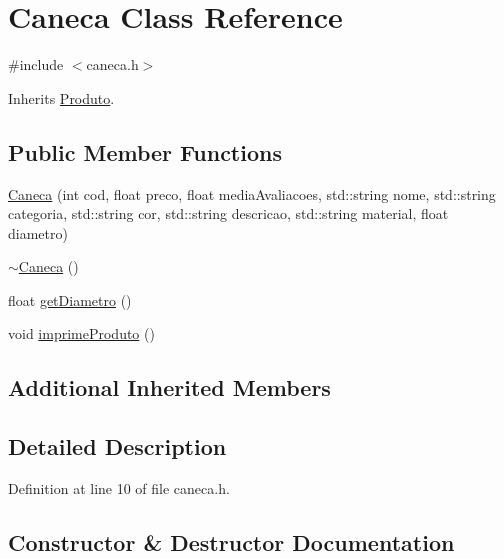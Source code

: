 \hypertarget{class_caneca}{}\section{Caneca Class Reference}
\label{class_caneca}


{\ttfamily \#include $<$caneca.\+h$>$}



Inherits \hyperlink{class_produto}{Produto}.

\subsection*{Public Member Functions}
\begin{DoxyCompactItemize}
\item 
\hyperlink{class_caneca_a192435fdd06311e0103bc516f7986934}{Caneca} (int cod, float preco, float media\+Avaliacoes, std\+::string nome, std\+::string categoria, std\+::string cor, std\+::string descricao, std\+::string material, float diametro)
\item 
\hyperlink{class_caneca_ac9225dbd6662bf26163020d0b612fb02}{$\sim$\+Caneca} ()
\item 
float \hyperlink{class_caneca_abc26fbf2dcf3a88a2b5c6bb867ecc3b2}{get\+Diametro} ()
\item 
void \hyperlink{class_caneca_adc870e460fa3e692c5da9a92a6fec531}{imprime\+Produto} ()
\end{DoxyCompactItemize}
\subsection*{Additional Inherited Members}


\subsection{Detailed Description}


Definition at line 10 of file caneca.\+h.



\subsection{Constructor \& Destructor Documentation}
\mbox{\label{class_caneca_a192435fdd06311e0103bc516f7986934}} 
